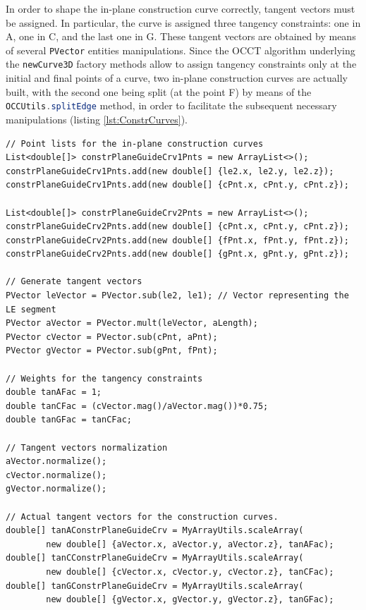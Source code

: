 \bigskip
\noindent
In order to shape the in-plane construction curve correctly, tangent vectors must be assigned. In particular, the curve is assigned three tangency constraints: one in A, one in C, and the last one in G. These tangent vectors are obtained by means of several \lstinline[language=Java]!PVector! entities manipulations. Since the \gls{OCCT} algorithm underlying the \lstinline[language=Java]!newCurve3D! factory methods allow to assign tangency constraints only at the initial and final points of a curve, two in-plane construction curves are actually built, with the second one being split (at the point F) by means of the \lstinline[language=Java]!OCCUtils.splitEdge! method, in order to facilitate the subsequent necessary manipulations (listing \ref{lst:ConstrCurves}).
%
\bigskip
\begin{lstlisting}[caption={In-plane construction curves building steps}, captionpos=b, tabsize=2, label={lst:ConstrCurves}]
// Point lists for the in-plane construction curves
List<double[]> constrPlaneGuideCrv1Pnts = new ArrayList<>();
constrPlaneGuideCrv1Pnts.add(new double[] {le2.x, le2.y, le2.z});
constrPlaneGuideCrv1Pnts.add(new double[] {cPnt.x, cPnt.y, cPnt.z});
		
List<double[]> constrPlaneGuideCrv2Pnts = new ArrayList<>();
constrPlaneGuideCrv2Pnts.add(new double[] {cPnt.x, cPnt.y, cPnt.z});
constrPlaneGuideCrv2Pnts.add(new double[] {fPnt.x, fPnt.y, fPnt.z});
constrPlaneGuideCrv2Pnts.add(new double[] {gPnt.x, gPnt.y, gPnt.z});

// Generate tangent vectors
PVector leVector = PVector.sub(le2, le1); // Vector representing the LE segment
PVector aVector = PVector.mult(leVector, aLength);
PVector cVector = PVector.sub(cPnt, aPnt); 
PVector gVector = PVector.sub(gPnt, fPnt);

// Weights for the tangency constraints
double tanAFac = 1;
double tanCFac = (cVector.mag()/aVector.mag())*0.75;
double tanGFac = tanCFac;

// Tangent vectors normalization
aVector.normalize();
cVector.normalize();
gVector.normalize();	
		
// Actual tangent vectors for the construction curves.
double[] tanAConstrPlaneGuideCrv = MyArrayUtils.scaleArray(
		new double[] {aVector.x, aVector.y, aVector.z}, tanAFac);
double[] tanCConstrPlaneGuideCrv = MyArrayUtils.scaleArray(
		new double[] {cVector.x, cVector.y, cVector.z}, tanCFac);
double[] tanGConstrPlaneGuideCrv = MyArrayUtils.scaleArray(
		new double[] {gVector.x, gVector.y, gVector.z}, tanGFac);


\end{lstlisting}
